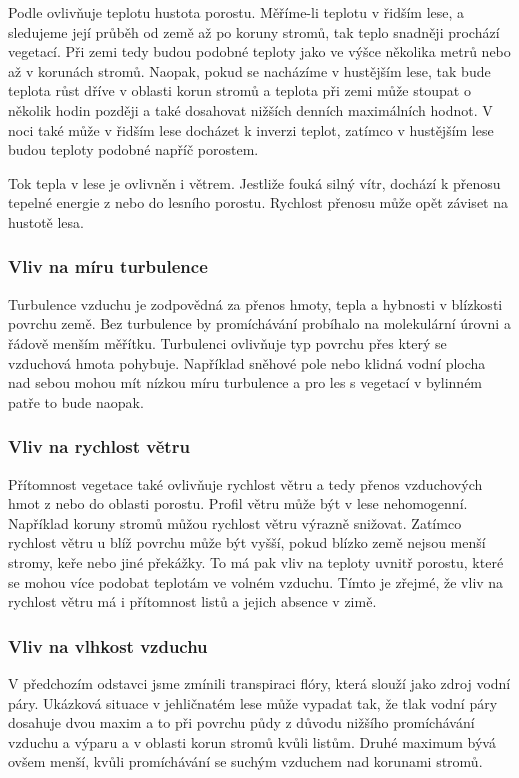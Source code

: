 Podle \cite{alma} ovlivňuje teplotu hustota porostu. Měříme-li teplotu v řidším lese, a sledujeme její průběh od země až po koruny stromů, tak teplo snadněji prochází vegetací. Při zemi tedy budou podobné teploty jako ve výšce několika metrů nebo až v korunách stromů. Naopak, pokud se nacházíme v hustějším lese, tak bude teplota růst dříve v oblasti korun stromů a teplota při zemi může stoupat o několik hodin později a také dosahovat nižších denních maximálních hodnot. V noci také může v řidším lese docházet k inverzi teplot, zatímco v hustějším lese budou teploty podobné napříč porostem. 

Tok tepla v lese je ovlivněn i větrem. Jestliže fouká silný vítr, dochází k přenosu tepelné energie z nebo do lesního porostu. Rychlost přenosu může opět záviset na hustotě lesa\cite{alma}. 

\subsubsection{Vliv na míru turbulence}\label{chap:vlivnaturbulenci}
Turbulence vzduchu je zodpovědná za přenos hmoty, tepla a hybnosti v blízkosti povrchu země. Bez turbulence by promíchávání probíhalo na molekulární úrovni a řádově menším měřítku. Turbulenci ovlivňuje typ povrchu přes který se vzduchová hmota pohybuje. Například sněhové pole nebo klidná vodní plocha nad sebou mohou mít nízkou míru turbulence a pro les s vegetací v bylinném patře to bude naopak\cite{alma}. 

\subsubsection{Vliv na rychlost větru}\label{chap:vlivnavitr}
Přítomnost vegetace také ovlivňuje rychlost větru a tedy přenos vzduchových hmot z nebo do oblasti porostu. Profil větru může být v lese nehomogenní. Například koruny stromů můžou rychlost větru výrazně snižovat. Zatímco rychlost větru u blíž povrchu může být vyšší, pokud blízko země nejsou menší stromy, keře nebo jiné překážky. To má pak vliv na teploty uvnitř porostu, které se mohou více podobat teplotám ve volném vzduchu. Tímto je zřejmé, že vliv na rychlost větru má i přítomnost listů a jejich absence v zimě\cite{alma}. 

\subsubsection{Vliv na vlhkost vzduchu}
V předchozím odstavci jsme zmínili transpiraci flóry, která slouží jako zdroj vodní páry. Ukázková situace v jehličnatém lese může vypadat tak, že tlak vodní páry dosahuje dvou maxim a to při povrchu půdy z důvodu nižšího promíchávání vzduchu a výparu a v oblasti korun stromů kvůli listům. Druhé maximum bývá ovšem menší, kvůli promíchávání se suchým vzduchem nad korunami stromů\cite{alma}. 

